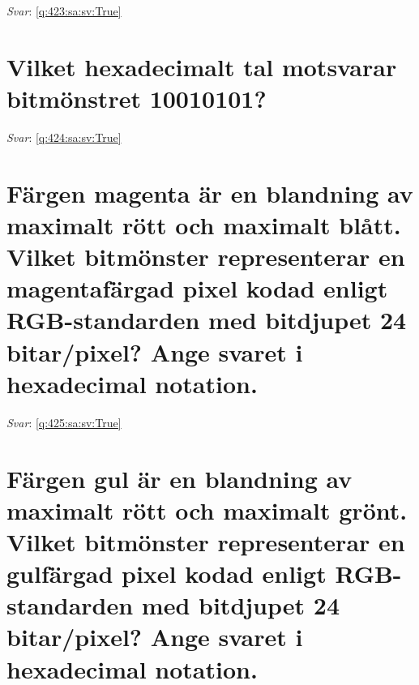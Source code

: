 \documentclass[a4paper,11pt,oneside]{book}
\begin{document}
\begin{sloppypar}
\label{q:423:sa:sv:False}

\vspace{2cm}

\noindent\makebox[\textwidth]{\hrulefill}

\vspace{1cm}

\textit{Svar}: \autoref{q:423:sa:sv:True}



\section{Vilket hexadecimalt tal motsvarar bitm\"onstret 10010101?}

\label{q:424:sa:sv:False}

\vspace{2cm}

\noindent\makebox[\textwidth]{\hrulefill}

\vspace{1cm}

\textit{Svar}: \autoref{q:424:sa:sv:True}



\section{F\"argen magenta \"ar en blandning av maximalt r\"ott och maximalt bl\r{a}tt. Vilket bitm\"onster representerar en magentaf\"argad pixel kodad enligt RGB-standarden med bitdjupet 24 bitar/pixel? Ange svaret i hexadecimal notation.}

\label{q:425:sa:sv:False}

\vspace{2cm}

\noindent\makebox[\textwidth]{\hrulefill}

\vspace{1cm}

\textit{Svar}: \autoref{q:425:sa:sv:True}



\section{F\"argen gul \"ar en blandning av maximalt r\"ott och maximalt gr\"ont. Vilket bitm\"onster representerar en gulf\"argad pixel kodad enligt RGB-standarden med bitdjupet 24 bitar/pixel? Ange svaret i hexadecimal notation.}

\label{q:426:sa:sv:False}

\vspace{2cm}


\end{sloppypar}
\end{document}
